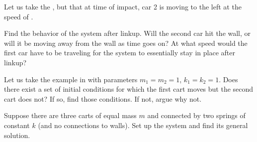 \documentclass{ximera}
\begin{document}
\begin{exercise}
    Let us take the , but that at time of impact, car 2 is moving to the left at the speed of .
    \begin{tasks}
        \task Find the behavior of the system after linkup.
        \task Will the second car hit the wall, or will it be moving away from the wall as time goes on?
        \task At what speed would the first car have to be traveling for the system to essentially stay in place after linkup?
    \end{tasks}
\end{exercise}

\begin{exercise}
    Let us take the example in  with parameters $m_1 = m_2 = 1$, $k_1 = k_2 = 1$.  Does there exist a set of initial conditions for which the first cart moves but the second cart does not? If so, find those conditions.  If not, argue why not.
\end{exercise}

\begin{exercise}%
    Suppose there are three carts of equal mass $m$ and connected by two springs of constant $k$ (and no connections to walls).  Set up the system and find its general solution.
\end{exercise}
\end{document}
